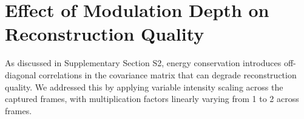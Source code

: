 \documentclass[pdflatex,sn-mathphys-num,Numbered]{sn-jnl}%
\theoremstyle{thmstyleone}%
\theoremstyle{thmstyletwo}%
\theoremstyle{thmstylethree}%
\begin{document}






\section{Effect of Modulation Depth on Reconstruction Quality}

As discussed in Supplementary Section S2, energy conservation introduces off-diagonal correlations in the covariance matrix that can degrade reconstruction quality. We addressed this by applying variable intensity scaling across the captured frames, with multiplication factors linearly varying from 1 to 2 across frames.
\end{document}
